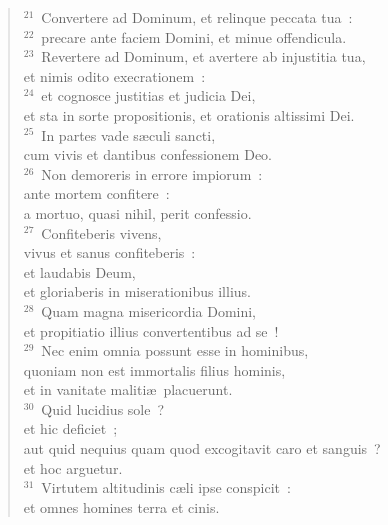 \begin{verse}${}^{21}$~Convertere ad Dominum, et relinque peccata tua~:\\
${}^{22}$~precare ante faciem Domini, et minue offendicula.\\
${}^{23}$~Revertere ad Dominum, et avertere ab injustitia tua,\\ et nimis odito execrationem~:\\
${}^{24}$~et cognosce justitias et judicia Dei,\\ et sta in sorte propositionis, et orationis altissimi Dei.\\
${}^{25}$~In partes vade s\ae culi sancti,\\ cum vivis et dantibus confessionem Deo.\\
${}^{26}$~Non demoreris in errore impiorum~:\\ ante mortem confitere~:\\ a mortuo, quasi nihil, perit confessio.\\
${}^{27}$~Confiteberis vivens,\\ vivus et sanus confiteberis~:\\ et laudabis Deum,\\ et gloriaberis in miserationibus illius.\\
${}^{28}$~Quam magna misericordia Domini,\\ et propitiatio illius convertentibus ad se~!\\
${}^{29}$~Nec enim omnia possunt esse in hominibus,\\ quoniam non est immortalis filius hominis,\\ et in vanitate maliti\ae\ placuerunt.\\
${}^{30}$~Quid lucidius sole~?\\ et hic deficiet~;\\ aut quid nequius quam quod excogitavit caro et sanguis~?\\ et hoc arguetur.\\
${}^{31}$~Virtutem altitudinis c\ae li ipse conspicit~:\\ et omnes homines terra et cinis.\end{verse}


